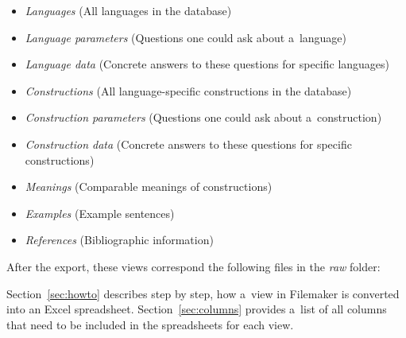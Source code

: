 \documentclass[12pt,a4paper]{scrartcl}
\begin{document}
\begin{itemize}
  \item \emph{Languages} (All languages in the database)
  \item \emph{Language parameters} (Questions one could ask about a~language)
  \item \emph{Language data} (Concrete answers to these questions for specific languages)
  \item \emph{Constructions} (All language-specific constructions in the database)
  \item \emph{Construction parameters} (Questions one could ask about a~construction)
  \item \emph{Construction data} (Concrete answers to these questions for specific constructions)
  \item \emph{Meanings} (Comparable meanings of constructions)
  \item \emph{Examples} (Example sentences)
  \item \emph{References} (Bibliographic information)
\end{itemize}

After the export, these views correspond the following files in the \emph{raw}
folder:

\begin{center}
\end{center}

Section~\ref{sec:howto} describes step by step, how a~view in Filemaker is
converted into an Excel spreadsheet.
Section~\ref{sec:columns} provides a~list of all columns that need to be
included in the spreadsheets for each view.
\end{document}
